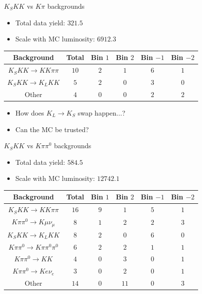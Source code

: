 \documentclass{beamer}
\begin{document}
\begin{frame}{$K_SKK$ vs $K\pi$ backgrounds}
  \begin{itemize}
    \item{Total data yield: $321.5$}
    \item{Scale with MC luminosity: $6912.3$}
  \end{itemize}
  \vspace{0.5cm}
  \centering
  \def\arraystretch{1.2}%
  \begin{tabular}{c|ccccc}
    Background              & Total  & Bin $1$ & Bin $2$ & Bin $-1$ & Bin $-2$ \\
    \hline
    $K_SKK\to KK\pi\pi$     & $10$   & $2$     & $1$     & $6$      & $1$ \\
    $K_SKK\to K_LKK$        & $5$    & $2$     & $0$     & $3$      & $0$ \\
    Other                   & $4$    & $0$     & $0$     & $2$      & $2$ \\
    \hline
  \end{tabular}
  \vspace{0.5cm}
  \begin{itemize}
    \item{How does $K_L\to K_S$ swap happen...?}
    \item{Can the MC be trusted?}
  \end{itemize}
\end{frame}

\begin{frame}{$K_SKK$ vs $K\pi\pi^0$ backgrounds}
  \begin{itemize}
    \item{Total data yield: $584.5$}
    \item{Scale with MC luminosity: $12742.1$}
  \end{itemize}
  \vspace{0.5cm}
  \centering
  \def\arraystretch{1.2}%
  \begin{tabular}{c|ccccc}
    Background                    & Total  & Bin $1$ & Bin $2$ & Bin $-1$ & Bin $-2$ \\
    \hline
    $K_SKK\to KK\pi\pi$           & $16$   & $9$     & $1$     & $5$      & $1$ \\
    $K\pi\pi^0\to K\mu\nu_\mu$    & $8$    & $1$     & $2$     & $2$      & $3$ \\
    $K_SKK\to K_LKK$              & $8$    & $2$     & $0$     & $6$      & $0$ \\
    $K\pi\pi^0\to K\pi\pi^0\pi^0$ & $6$    & $2$     & $2$     & $1$      & $1$ \\
    $K\pi\pi^0\to KK$             & $4$    & $0$     & $3$     & $0$      & $1$ \\
    $K\pi\pi^0\to Ke\nu_e$        & $3$    & $0$     & $2$     & $0$      & $1$ \\
    Other                         & $14$   & $0$     & $11$    & $0$      & $3$ \\
    \hline
  \end{tabular}
  \vspace{0.5cm}
\end{frame}
\end{document}
